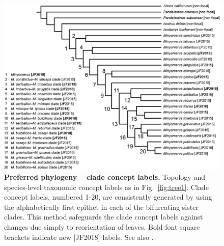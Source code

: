 \documentclass[fleqn,10pt,lineno]{wlpeerj} %
\begin{document}
\begin{figure}[h]
	\centering
	\begin{sideways}
		\includegraphics[height=0.85\textwidth]{figure38.png}
	\end{sideways}
	\caption{\textbf{Preferred phylogeny -- clade concept labels.} Topology and species-level taxonomic concept labels as in Fig.~\ref{fig:tree1}. Clade concept labels, numbered 1-20, are consistently generated by using the alphabetically first epithet in each of the bifurcating sister clades. This method safeguards the clade concept labels against changes due simply to reorientation of leaves. Bold-font square brackets indicate new [JF2018] labels. See also \textbf{}.}
	\label{fig:tree2}
\end{figure}
\end{document}
